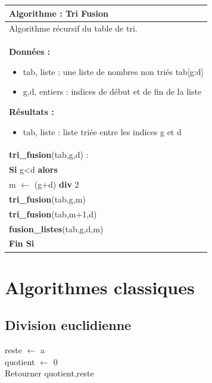 \documentclass[10pt]{article}
\begin{document}
\begin{pseudo}
\begin{center}
\begin{tabular}{p{}}
\hline
\textbf{Algorithme :} Tri Fusion \\
\hline
Algorithme récursif du table de tri. \\
\textbf{Données :}
\begin{itemize}
\item \textsf{tab}, liste : une liste de nombres non triés \textsf{tab[g:d]} 
\item \textsf{g,d}, entiers : indices de début et de fin de la liste
\end{itemize}
\textbf{Résultats :} 
\begin{itemize}
\item \textsf{tab}, liste : liste triée entre les indices \textsf{g} et \textsf{d}
\end{itemize}
\\
\textbf{tri\_fusion}(\textsf{tab,g,d}) :\\
\hspace{.4cm} \textbf{Si} \textsf{g<d}  \textbf{alors} \\
\hspace{.8cm} \textsf{m $\leftarrow$ (g+d)} \textbf{div} 2\\
\hspace{.8cm} \textbf{tri\_fusion}(tab,g,m) \\
\hspace{.8cm} \textbf{tri\_fusion}(tab,m+1,d) \\
\hspace{.8cm} \textbf{fusion\_listes}(tab,g,d,m) \\
\hspace{.4cm}  \textbf{Fin Si}\\
\hline
\end{tabular}
\end{center}
\end{pseudo}

\section{Algorithmes classiques}
\subsection{Division euclidienne}
\begin{pseudo}
\begin{algorithm}[H]
reste $\gets$ a\\
quotient $\gets$ 0\\
Retourner quotient,reste
\end{algorithm}
\end{pseudo}
\end{document}
